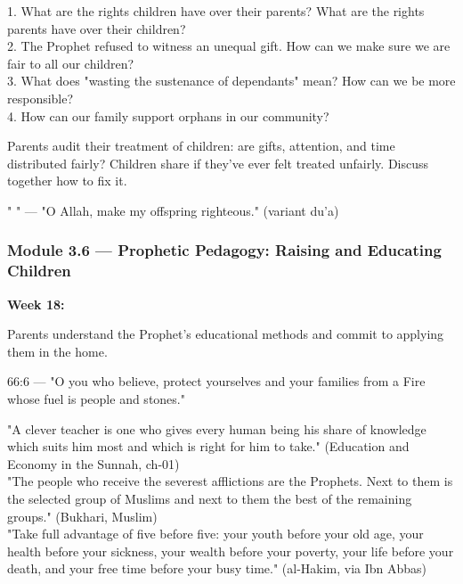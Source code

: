\documentclass[11pt,a4paper]{article}
\begin{document}
\begin{discussionbox} 1. What are the rights children have over their parents? What are the rights parents have over their children? \\ 2. The Prophet refused to witness an unequal gift. How can we make sure we are fair to all our children? \\ 3. What does "wasting the sustenance of dependants" mean? How can we be more responsible? \\ 4. How can our family support orphans in our community? \end{discussionbox}

\begin{activitybox} Parents audit their treatment of children: are gifts, attention, and time distributed fairly? Children share if they've ever felt treated unfairly. Discuss together how to fix it. \end{activitybox}

\begin{duabox} "   " --- "O Allah, make my offspring righteous." (variant du'a) \end{duabox}

\vspace{6pt}\noindent{\color{border}\rule{\textwidth}{0.5pt}}\vspace{6pt}

\subsubsection*{Module 3.6 --- Prophetic Pedagogy: Raising and Educating Children}
\textbf{Week 18:} 

\begin{outcomebox} Parents understand the Prophet's educational methods and commit to applying them in the home. \end{outcomebox}

\begin{quranbox} 66:6 --- "O you who believe, protect yourselves and your families from a Fire whose fuel is people and stones." \end{quranbox}

\begin{hadithbox} "A clever teacher is one who gives every human being his share of knowledge which suits him most and which is right for him to take." (Education and Economy in the Sunnah, ch-01) \\ "The people who receive the severest afflictions are the Prophets. Next to them is the selected group of Muslims and next to them the best of the remaining groups." (Bukhari, Muslim) \\ "Take full advantage of five before five: your youth before your old age, your health before your sickness, your wealth before your poverty, your life before your death, and your free time before your busy time." (al-Hakim, via Ibn Abbas) \end{hadithbox}
\end{document}
